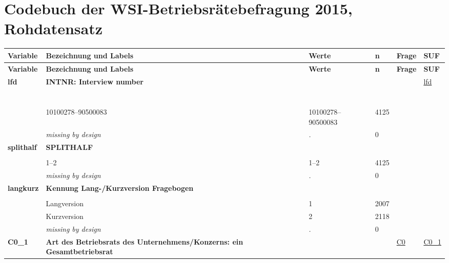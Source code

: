 \section{Codebuch der WSI-Betriebsrätebefragung 2015, Rohdatensatz}\label{kap_rohdaten}
\begin{longtable}{| L{2.45cm} | L{6cm} | C{1.5cm} | R{1cm} | C{2.25cm} | C{2.25cm} |}
\toprule
\textbf{Variable} & \textbf{Bezeichnung und Labels}& \textbf{Werte} &  \textbf{n} & \textbf{Frage} & \textbf{SUF} \\
\midrule
\endfirsthead
\toprule
\textbf{Variable} & \textbf{Bezeichnung und Labels}& \textbf{Werte} & \textbf{n} & \textbf{Frage} & \textbf{SUF} \\
\midrule
\endhead
\midrule
\endfoot
\bottomrule
\endlastfoot
 \textbf{lfd}\label{var:lfd} & \textbf{INTNR: Interview number} &  &  &  & \hyperref[var:suf:lfd]{lfd} \\ 
   & \protect\subsection[Variablen lfd bis ORDER37\_G1]{} &  &  &  &  \\ 
   & 10100278--90500083 & 10100278--90500083 & 4125 &  &  \\ 
   & \textit{missing by design} & \textit{.} & 0 &  &  \\ 
   \midrule
\textbf{splithalf}\label{var:splithalf} & \textbf{SPLITHALF} &  &  &  & \hyperref[var:suf:]{} \\ 
   &  &  &  &  &  \\ 
   & 1--2 & 1--2 & 4125 &  &  \\ 
   & \textit{missing by design} & \textit{.} & 0 &  &  \\ 
   \midrule
\textbf{langkurz}\label{var:langkurz} & \textbf{Kennung Lang-/Kurzversion Fragebogen} &  &  &  & \hyperref[var:suf:]{} \\ 
   &  &  &  &  &  \\ 
   & Langversion & 1 & 2007 &  &  \\ 
   & Kurzversion & 2 & 2118 &  &  \\ 
   & \textit{missing by design} & \textit{.} & 0 &  &  \\ 
   \midrule
\textbf{C0\_1}\label{var:C0:1} & \textbf{Art des Betriebsrats des Unternehmens/Konzerns: ein Gesamtbetriebsrat} &  &  & \hyperref[C0]{C0} & \hyperref[var:suf:C0:1]{C0\_1} \\ 

\end{longtable}
